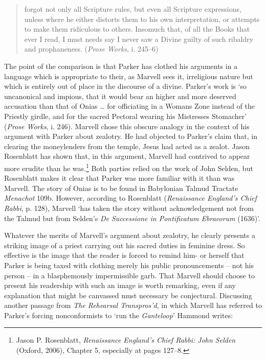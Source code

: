 ﻿\documentclass[12pt]{article}
\newcommand{\citedtitle}[1]{\textit{#1}}
\begin{document}
\begin{quote}
forgot not only all Scripture rules, but even all Scripture expressions, unless where he either distorts them to his own interpretation, or attempts to make them ridiculous to others. Insomuch that, of all the Books that ever I read, I must needs say I never saw a Divine guilty of such ribaldry and prophaneness. (\citedtitle{Prose Works}, i. 245–6)
\end{quote}
The point of the comparison is that Parker has clothed his arguments in a language
which is appropriate to their, as Marvell sees it, irreligious nature but which
is entirely out of place in the discourse of a divine. Parker’s work is ‘so
uncanonical and impious, that it would bear an higher and more deserved
accusation than that of Onias … for officiating in a Womans Zone instead of the
Priestly girdle, and for the sacred Pectoral wearing his Mistresses Stomacher’
(\citedtitle{Prose
Works}, i. 246). Marvell chose this obscure analogy in the context of his argument with
Parker about zealotry. He had objected to Parker’s claim that, in clearing the
moneylenders from the temple, Jesus had acted as a zealot. Jason Rosenblatt has
shown that, in this argument, Marvell had contrived to appear more erudite than
he was.\footnote{Jason P. Rosenblatt, \citedtitle{Renaissance England’s Chief Rabbi: John Selden} (Oxford, 2006), Chapter 5, especially at pages 127–8.}
Both parties relied on the work of John Selden, but Rosenblatt makes it clear
that Parker was more familiar with it than was Marvell. The story of Onias is
to be found in Babylonian Talmud Tractate \citedtitle{Menachot} 109b. However,
according to Rosenblatt (\citedtitle{Renaissance England’s Chief Rabbi}, p. 128), Marvell ‘has
taken the story without acknowledgement not from the Talmud but from Selden’s \citedtitle{De
Successione in Pontificatum Ebraeorum} (1636)’.

Whatever
the merits of Marvell’s argument about zealotry, he clearly presents a striking
image of a priest carrying out his sacred duties in feminine dress. So
effective is the image that the reader is forced to remind him- or herself that
Parker is being taxed with clothing merely his public pronouncements – not his
person – in a blasphemously impermissible garb. That Marvell should choose to
present his readership with such an image is worth remarking, even if any
explanation that might be canvassed must necessary be conjectural. Discussing
another passage from \citedtitle{The Rehearsal Transpros’d}, in which Marvell has
referred to Parker’s forcing nonconformists to ‘run the \emph{Ganteloop}’ Hammond writes:
\end{document}

